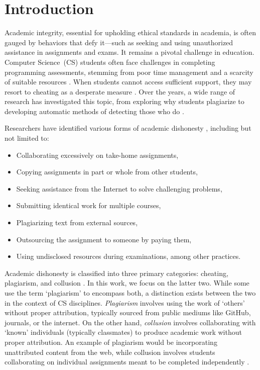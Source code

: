 \section{Introduction} \label{sec:intro}

Academic integrity, essential for upholding ethical standards in academia, is often gauged by behaviors that defy it—such as seeking and using unauthorized assistance in assignments and exams. It remains a pivotal challenge in education. Computer Science~(CS) students often face challenges in completing programming assessments, stemming from poor time management and a scarcity of suitable resources \cite{10.5555/858403.858418}. When students cannot access sufficient support, they may resort to cheating as a desperate measure \cite{10.1145/3059009.3059065, 10.1145/1632149.1632168}. Over the years, a wide range of research has investigated this topic, from exploring why students plagiarize to developing automatic methods of detecting those who do \cite{10.5120/ijca2015906113}.

Researchers have identified various forms of academic dishonesty \cite{40db574cf24f441d994cbb1cd909bd1f}, including but not limited to:

\begin{itemize}
    \item Collaborating excessively on take-home assignments,
    \item Copying assignments in part or whole from other students,
    \item Seeking assistance from the Internet to solve challenging problems,
    \item Submitting identical work for multiple courses,
    \item Plagiarizing text from external sources,
    \item Outsourcing the assignment to someone by paying them,
    \item Using undisclosed resources during examinations, among other practices.
\end{itemize} 

Academic dishonesty is classified into three primary categories: cheating, plagiarism, and collusion \cite{8937362}. In this work, we focus on the latter two. While some use the term `plagiarism' to encompass both, a distinction exists between the two in the context of CS disciplines. \textit{Plagiarism} involves using the work of `others' without proper attribution, typically sourced from public mediums like GitHub, journals, or the internet. On the other hand, \textit{collusion} involves collaborating with `known' individuals (typically classmates) to produce academic work without proper attribution. An example of plagiarism would be incorporating unattributed content from the web, while collusion involves students collaborating on individual assignments meant to be completed independently \cite{Owunwanne, Fraser2014CollaborationCA,JonesJuliet}.

